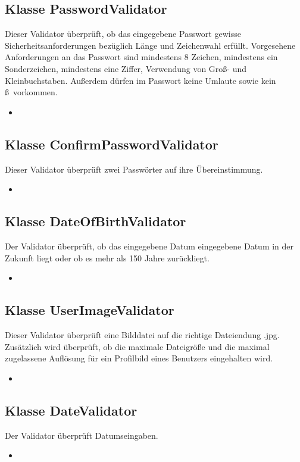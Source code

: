 \documentclass[a4paper]{scrreprt}
\begin{document}
	\subsection{Klasse PasswordValidator}
	Dieser Validator überprüft, ob das eingegebene Passwort gewisse Sicherheitsanforderungen bezüglich Länge und Zeichenwahl erfüllt. Vorgesehene Anforderungen an das Passwort sind mindestens 8 Zeichen, mindestens ein Sonderzeichen, mindestens eine Ziffer, Verwendung von Groß- und Kleinbuchstaben. Außerdem dürfen im Passwort keine Umlaute sowie kein \grq ß\grq \ vorkommen.
	\begin{itemize}
		\item \override
	\end{itemize}
	
	\subsection{Klasse ConfirmPasswordValidator}
	Dieser Validator überprüft zwei Passwörter auf ihre Übereinstimmung.
	\begin{itemize}
		\item \override
	\end{itemize}
	
	\subsection{Klasse DateOfBirthValidator}
	Der Validator überprüft, ob das eingegebene Datum eingegebene Datum in der Zukunft liegt oder ob es mehr als 150 Jahre zurückliegt.
	\begin{itemize}
		\item \override
	\end{itemize}
	
	\subsection{Klasse UserImageValidator}
	Dieser Validator überprüft eine Bilddatei auf die richtige Dateiendung .jpg. Zusätzlich wird überprüft, ob
	die maximale Dateigröße und die maximal zugelassene Auflösung für ein Profilbild eines Benutzers eingehalten wird.
	\begin{itemize}
		\item \override
	\end{itemize}
	
	\subsection{Klasse DateValidator}
	Der Validator überprüft Datumseingaben.
	\begin{itemize}
		\item \override
	\end{itemize}
	
\end{document}
